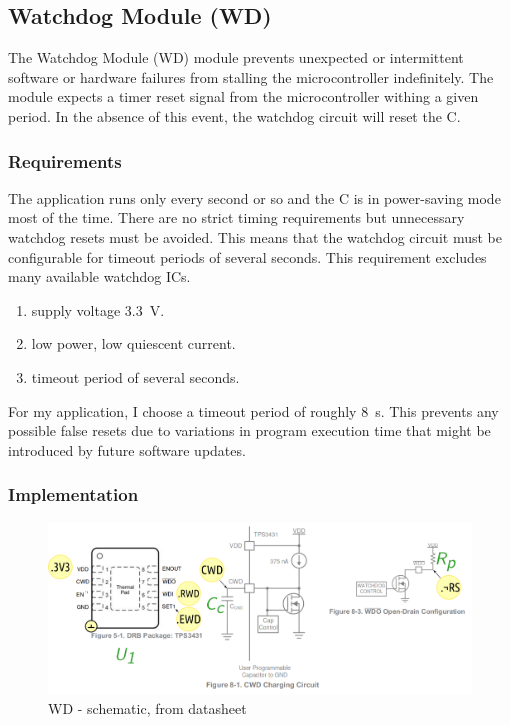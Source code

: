 \subsection{Watchdog Module (WD) }
\label{sec:WD}

The Watchdog Module (WD) module prevents unexpected or intermittent software or hardware failures from stalling the microcontroller
indefinitely. The module expects a timer reset signal from the microcontroller withing a given period. In the absence of this
event, the watchdog circuit will reset the \mu C.

\subsubsection{Requirements}

The application runs only every second or so and the \mu C is
in power-saving mode most of the time. There are no strict timing requirements but unnecessary watchdog resets must be avoided.
This means that the watchdog circuit must be configurable for timeout periods of several seconds.
This requirement excludes many available watchdog ICs. \par

\begin{enumerate}
    \item supply voltage  \SI{3.3}{\V}.
    \item low power, low quiescent current.
    \item timeout period of several seconds.
\end{enumerate}

For my application, I choose a timeout period of roughly \SI{8}{\s}. This prevents any possible false resets due to
variations in program execution time that might be introduced by future software updates.

\subsubsection{Implementation}




\clearpage
\begin{figure}[h]
    \centering
    \includegraphics[width=1.0\textwidth]{MA/WD/WD}
    \caption{WD - schematic, from datasheet \cite{noauthor_tps3431_2018}}
\end{figure}

\clearpage



